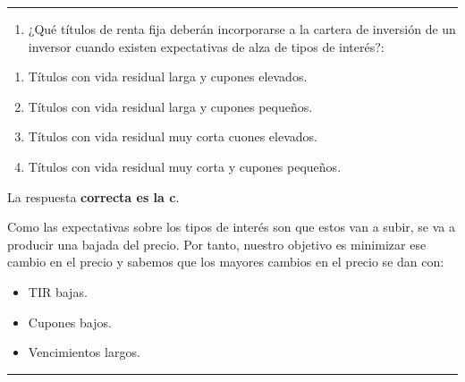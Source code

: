 \documentclass[
  letterpaper,
  DIV=11,
  numbers=noendperiod]{scrreprt}
\providecommand{\tightlist}{%
  \setlength{\itemsep}{0pt}\setlength{\parskip}{0pt}}\usepackage{longtable,booktabs,array}
\begin{document}
\begin{center}\rule{0.5\linewidth}{0.5pt}\end{center}

\begin{enumerate}
\def\labelenumi{\arabic{enumi}.}
\setcounter{enumi}{53}
\tightlist
\item
  ¿Qué títulos de renta fija deberán incorporarse a la cartera de
  inversión de un inversor cuando existen expectativas de alza de tipos
  de interés?:
\end{enumerate}

\begin{enumerate}
\def\labelenumi{\alph{enumi}.}
\item
  Títulos con vida residual larga y cupones elevados.
\item
  Títulos con vida residual larga y cupones pequeños.
\item
  Títulos con vida residual muy corta cuones elevados.
\item
  Títulos con vida residual muy corta y cupones pequeños.
\end{enumerate}

\begin{tcolorbox}[enhanced jigsaw, left=2mm, opacityback=0, colback=white, breakable, arc=.35mm, bottomrule=.15mm, rightrule=.15mm, toprule=.15mm, leftrule=.75mm, colframe=quarto-callout-tip-color-frame]
\begin{minipage}[t]{5.5mm}
\textcolor{quarto-callout-tip-color}{\faLightbulb}
\end{minipage}%
\begin{minipage}[t]{\textwidth - 5.5mm}

La respuesta \textbf{correcta es la c}.

Como las expectativas sobre los tipos de interés son que estos van a
subir, se va a producir una bajada del precio. Por tanto, nuestro
objetivo es minimizar ese cambio en el precio y sabemos que los mayores
cambios en el precio se dan con:

\begin{itemize}
\item
  TIR bajas.
\item
  Cupones bajos.
\item
  Vencimientos largos.
\end{itemize}

\end{minipage}%
\end{tcolorbox}

\begin{center}\rule{0.5\linewidth}{0.5pt}\end{center}
\end{document}
